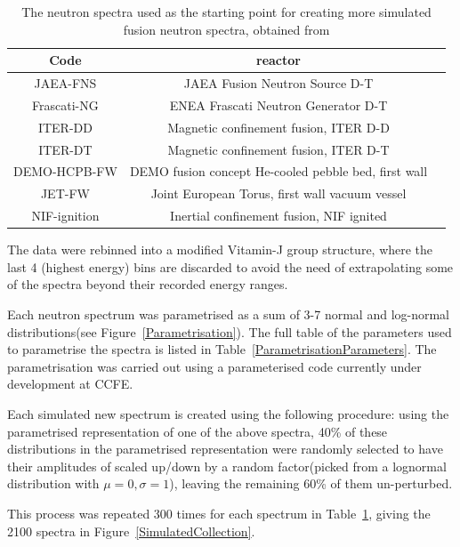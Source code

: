 \documentclass[a4paper, 12pt]{article}
\begin{document}
\begin{table}
\begin{tabularx}{\textwidth}{ccX}
Code & reactor\\
\hline
JAEA-FNS & JAEA Fusion Neutron Source D-T\\
Frascati-NG & ENEA Frascati Neutron Generator D-T\\
ITER-DD & Magnetic confinement fusion, ITER D-D\\
ITER-DT & Magnetic confinement fusion, ITER D-T\\
DEMO-HCPB-FW & DEMO fusion concept He-cooled pebble bed, first wall\\
JET-FW & Joint European Torus, first wall vacuum vessel\\
NIF-ignition & Inertial confinement fusion, NIF ignited\\
\end{tabularx}
\caption{The neutron spectra used as the starting point for creating more simulated fusion neutron spectra, obtained from \cite{FISPACT_reference_spectra} }\label{DataAugmentationSource}
\end{table}
The data were rebinned into a modified Vitamin-J group structure, where the last 4 (highest energy) bins are discarded to avoid the need of extrapolating some of the spectra beyond their recorded energy ranges.

Each neutron spectrum was parametrised as a sum of 3-7 normal and log-normal distributions(see Figure~\ref{Parametrisation}). The full table of the parameters used to parametrise the spectra is listed in Table~\ref{ParametrisationParameters}. The parametrisation was carried out using a parameterised code currently under development at CCFE. %

Each simulated new spectrum is created using the following procedure: using the parametrised representation of one of the above spectra, 40\% of these distributions in the parametrised representation were randomly selected to have their amplitudes of scaled up/down by a random factor(picked from a lognormal distribution with $\mu =0, \sigma = 1$), leaving the remaining 60\% of them un-perturbed.

This process was repeated 300 times for each spectrum in Table~\ref{DataAugmentationSource}, giving the 2100 spectra in Figure~\ref{SimulatedCollection}.
\end{document}
